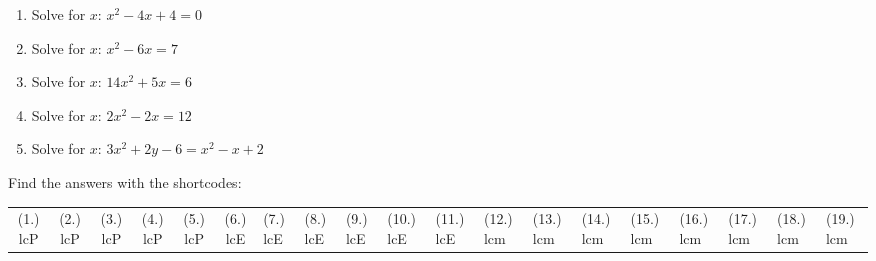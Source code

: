 \begin{enumerate}[noitemsep, label=\textbf{\arabic*}. ]
\label{m39247*uid59}\item Solve for \begin{math}x\end{math}: \begin{math}{x}^{2}-4x+4=0\end{math}\hspace{1ex}        \label{m39247*uid60}\item Solve for \begin{math}x\end{math}: \begin{math}{x}^{2}-6x=7\end{math}\hspace{1ex}        
\label{m39247*uid61}\item Solve for \begin{math}x\end{math}: \begin{math}14{x}^{2}+5x=6\end{math}\hspace{1ex}        
\label{m39247*uid62}\item Solve for \begin{math}x\end{math}: \begin{math}2{x}^{2}-2x=12\end{math}\hspace{1ex}        
\label{m39247*uid63}\item Solve for \begin{math}x\end{math}: \begin{math}3{x}^{2}+2y-6={x}^{2}-x+2\end{math}\hspace{1ex}        
\end{enumerate}
        
        

      
    
\label{m39247**end}
          
\par {} Find the answers with the shortcodes:
 \par \begin{tabular}[h]{cccccc}
 (1.) lcP  &  (2.) lcP  &  (3.) lcP  &  (4.) lcP  &  (5.) lcP  &  (6.) lcE  &  (7.) lcE  &  (8.) lcE  &  (9.) lcE  &  (10.) lcE  &  (11.) lcE  &  (12.) lcm  &  (13.) lcm  &  (14.) lcm  &  (15.) lcm  &  (16.) lcm  &  (17.) lcm  &  (18.) lcm  &  (19.) lcm  & \end{tabular}



